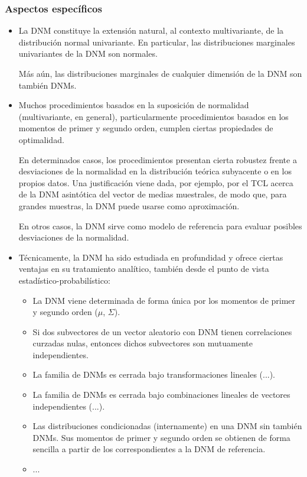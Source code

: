 \documentclass[11pt,a4paper]{article}
\begin{document}
\subsubsection{Aspectos específicos}
\begin{itemize}
\item La DNM constituye la extensión natural, al contexto multivariante, de la distribución normal univariante. En particular, las distribuciones marginales univariantes de la DNM son normales.

Más aún, las distribuciones marginales de cualquier dimensión de la DNM son también DNMs.

\item Muchos procedimientos basados en la suposición de normalidad (multivariante, en general), particularmente procedimientos basados en los momentos de primer y segundo orden, cumplen ciertas propiedades de optimalidad.

En determinados casos, los procedimientos presentan cierta robustez frente a desviaciones de la normalidad en la distribución teórica subyacente o en los propios datos. Una justificación viene dada, por ejemplo, por el TCL acerca de la DNM asintótica del vector de medias muestrales, de modo que, para grandes muestras, la DNM puede usarse como aproximación.

En otros casos, la DNM sirve como modelo de referencia para evaluar posibles desviaciones de la normalidad.

\item Técnicamente, la DNM ha sido estudiada en profundidad y ofrece ciertas ventajas en su tratamiento analítico, también desde el punto de vista estadístico-probabilístico:
\begin{itemize}
\item La DNM viene determinada de forma única por los momentos de primer y segundo orden ($\mu$, $\Sigma$).

\item Si dos subvectores de un vector aleatorio con DNM tienen correlaciones curzadas nulas, entonces dichos subvectores son mutuamente independientes.

\item La familia de DNMs es cerrada bajo transformaciones lineales (...).

\item La familia de DNMs es cerrada bajo combinaciones lineales de vectores independientes (...).

\item Las distribuciones condicionadas (internamente) en una DNM sin también DNMs. Sus momentos de primer y segundo orden se obtienen de forma sencilla a partir de los correspondientes a la DNM de referencia.

\item ...
\end{itemize}
\end{itemize}
\end{document}
